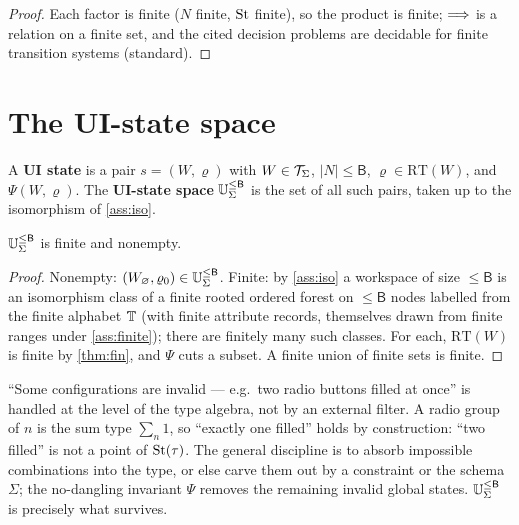 \documentclass[../uxoxo-main]{subfiles}
\begin{document}
\begin{proof}
Each factor is finite ($N$ finite, $\mathrm{St}$ finite), so the product is finite;
$\overset{}{\Longrightarrow}$ is a relation on a finite set, and the cited decision problems are
decidable for finite transition systems (standard).
\end{proof}

\section{The UI-state space}\label{sec:uistate}
\begin{definition}\label{def:ustate}
A \textbf{UI state} is a pair $s=(W,\varrho)$ with $W\in\mathcal{T}_\Sigma$,
$\lvert N\rvert\le\mathsf B$, $\varrho\in\mathrm{RT}(W)$, and $\Psi(W,\varrho)$.
The \textbf{UI-state space} $\mathbb{U}_{\Sigma}^{\le \mathsf{B}}$ is the set of all such pairs, taken up to the
isomorphism of \cref{ass:iso}.
\end{definition}

\begin{proposition}\label{prop:Ufinite}
$\mathbb{U}_{\Sigma}^{\le \mathsf{B}}$ is finite and nonempty.
\end{proposition}

\begin{proof}
Nonempty: $(W_{\varnothing},\varrho_0)\in\mathbb{U}_{\Sigma}^{\le \mathsf{B}}$. Finite: by \cref{ass:iso} a workspace of
size $\le\mathsf B$ is an isomorphism class of a finite rooted ordered forest on
$\le\mathsf B$ nodes labelled from the finite alphabet $\mathbb{T}$ (with finite
attribute records, themselves drawn from finite ranges under \cref{ass:finite});
there are finitely many such classes. For each, $\mathrm{RT}(W)$ is finite by
\cref{thm:fin}, and $\Psi$ cuts a subset. A finite union of finite sets is
finite.
\end{proof}

\begin{remark}\label{rem:valid}
``Some configurations are invalid --- e.g.\ two radio buttons filled at once''
is handled at the level of the type algebra, not by an external filter. A radio
group of $n$ is the sum type $\sum_{n}1$, so ``exactly one filled'' holds by
construction: ``two filled'' is not a point of $\mathrm{St}(\tau)$. The general
discipline is to absorb impossible combinations into the type, or else carve
them out by a constraint or the schema $\Sigma$; the no-dangling invariant $\Psi$
removes the remaining invalid global states. $\mathbb{U}_{\Sigma}^{\le \mathsf{B}}$ is precisely what survives.
\end{remark}
\end{document}
